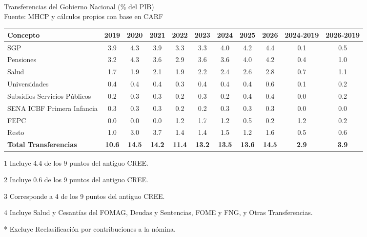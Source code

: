 \begin{frame}{Transferencias del Gobierno Nacional (\% del PIB) \\ \small{Fuente: MHCP y cálculos propios con base en CARF}}
\scriptsize
\begin{threeparttable}
\setlength{\tabcolsep}{3.5pt}
\begin{tabular}{l*{8}{S}|S|S}
\textbf{Concepto} & \textbf{2019} & \textbf{2020} & \textbf{2021} & \textbf{2022} & \textbf{2023} & \textbf{2024} & \textbf{2025} & \textbf{2026} & \textbf{\tiny{2024-2019}} & \textbf{\tiny{2026-2019}} \\ \hline
SGP                              & 3.9 & 4.3 & 3.9 & 3.3 & 3.3 & 4.0 & 4.2 & 4.4 & 0.1 & 0.5 \\
Pensiones                        & 3.2 & 4.3 & 3.6 & 2.9 & 3.6 & 3.6 & 4.0 & 4.2 & 0.4 & 1.0 \\
Salud                   & 1.7 & 1.9 & 2.1 & 1.9 & 2.2 & 2.4 & 2.6 & 2.8 & 0.7 & 1.1 \\
Universidades           & 0.4 & 0.4 & 0.4 & 0.3 & 0.4 & 0.4 & 0.4 & 0.6 & 0.1 & 0.2 \\
Subsidios Servicios Públicos     & 0.2 & 0.3 & 0.3 & 0.2 & 0.3 & 0.2 & 0.4 & 0.4 & 0.0 & 0.2 \\
SENA ICBF Primera Infancia & 0.3 & 0.3 & 0.3 & 0.2 & 0.2 & 0.3 & 0.3 & 0.3 & 0.0 & 0.0 \\
FEPC                             & 0.0 & 0.0 & 0.0 & 1.2 & 1.7 & 1.2 & 0.5 & 0.2 & 1.2 & 0.2 \\
Resto                   & 1.0 & 3.0 & 3.7 & 1.4 & 1.4 & 1.5 & 1.2 & 1.6 & 0.5 & 0.6 \\
\textbf{Total Transferencias\tnote{*}} & \textbf{10.6} & \textbf{14.5} & \textbf{14.2} & \textbf{11.4} & \textbf{13.2} & \textbf{13.5} & \textbf{13.6} & \textbf{14.5} & \textbf{2.9} & \textbf{3.9} \\ \hline
\end{tabular}
\begin{tablenotes}[flushleft]
\tiny
\item[1] Incluye 4.4 de los 9 puntos del antiguo CREE.
\item[2] Incluye 0.6 de los 9 puntos del antiguo CREE.
\item[3] Corresponde a 4 de los 9 puntos del antiguo CREE.
\item[4] Incluye Salud y Cesantías del FOMAG, Deudas y Sentencias, FOME y FNG, y Otras Transferencias.
\item[*] Excluye Reclasificación por contribuciones a la nómina.
\end{tablenotes}
\end{threeparttable}
\end{frame}
